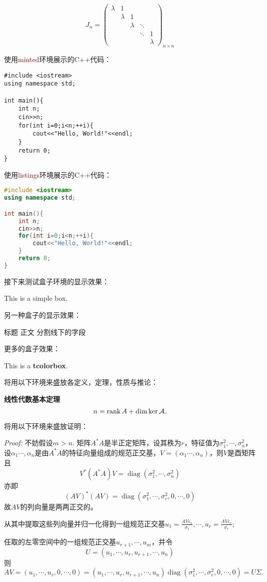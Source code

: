 \documentclass{article}
\newcommand{\inl}[1]{{\small{\colorbox{codegray}{\textcolor{darkred}{#1}}}}}
\newenvironment{sol_box}{
    \begin{tcolorbox}[enhanced, colback=green2, boxrule=0pt, frame hidden,
        borderline west={0.7mm}{0.1mm}{green1},breakable]
}{\end{tcolorbox}}
\newenvironment{sol}[1][]{\begin{sol_box}{\large\textbf{#1}}\newline}{\end{sol_box}}
\newenvironment{prf_box}{
    \begin{tcolorbox}[enhanced, colback=lightgray, boxrule=0pt, frame hidden,
        borderline west={0.7mm}{0.1mm}{darkgray},breakable,after upper={$\square$}]
}{\end{tcolorbox}}
\newenvironment{prf}{\begin{prf_box}{\textit{Proof:}\newline}}{\end{prf_box}}
\DeclareMathOperator{\diag}{diag}                       %
\begin{document}
\[J_n=\begin{pmatrix}
    \lambda&1& & & \\
    & \lambda&1& & \\
    & &\lambda&\ddots& \\
    & & &\ddots&1\\
    & & & &\lambda
\end{pmatrix}_{n\times n}\]

使用\inl{minted}环境展示的C++代码：

\begin{verbatim}
#include <iostream>
using namespace std;

int main(){
    int n;
    cin>>n;
    for(int i=0;i<n;++i){
        cout<<"Hello, World!"<<endl;
    }
    return 0;
}
\end{verbatim}

使用\inl{listings}环境展示的C++代码：

\begin{lstlisting}[language=c++]
#include <iostream>
using namespace std;

int main(){
    int n;
    cin>>n;
    for(int i=0;i<n;++i){
        cout<<"Hello, World!"<<endl;
    }
    return 0;
}
\end{lstlisting}

接下来测试盒子环境的显示效果：

\begin{blackbox}
    This is a simple box.
\end{blackbox}

另一种盒子的显示效果：

\begin{testbox}{标题}
    正文
    \tcblower
    分割线下的字段
\end{testbox}

更多的盒子效果：
\begin{textbox}[ForTesting]
    This is a \textbf{tcolorbox}.
\end{textbox}

将用以下环境来盛放各定义，定理，性质与推论：
\begin{sol}[线性代数基本定理]
    \[n=\rank A+\dim\ker \mathcal{A}.\]
\end{sol}

将用以下环境来盛放证明：
\begin{prf}
    不妨假设$m>n$. 矩阵$A^*A$是半正定矩阵，设其秩为$r$，特征值为$\sigma_1^2,\cdots,\sigma_n^2$，设$\alpha_1\cdots,\alpha_n$是由$A^*A$的特征向量组成的规范正交基，$V=(\alpha_1\cdots,\alpha_n)$，则$V$是酉矩阵且\[V^*(A^*A)V=\diag(\sigma_1^2,\cdots,\sigma_n^2)\]
    亦即\[(AV)^*(AV)=\diag(\sigma_1^2,\cdots,\sigma_r^2,0,\cdots,0)\]
    故$AV$的列向量是两两正交的。

    从其中提取这些列向量并归一化得到一组规范正交基$\displaystyle u_1=\frac{AVe_1}{\sigma_1},\cdots, u_r=\frac{AVe_r}{\sigma_r} $;

    任取的左零空间中的一组规范正交基$u_{r+1},\cdots,u_m$，并令\[
    U=(u_1,\cdots,u_r,u_{r+1},\cdots,u_n)
    \]
    则\[AV=(u_1,\cdots,u_r,0,\cdots,0)=(u_1,\cdots,u_r,u_{r+1},\cdots,u_n)\diag(\sigma_1^2,\cdots,\sigma_r^2,0,\cdots,0)=U\Sigma.
    \]
\end{prf}
\end{document}
